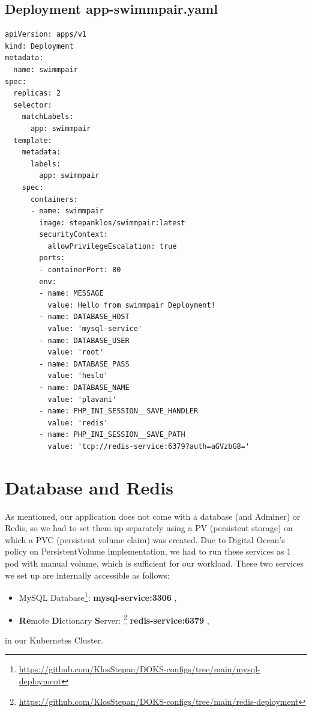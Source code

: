 \subsection*{Deployment app-swimmpair.yaml}
\begin{lstlisting}
apiVersion: apps/v1
kind: Deployment
metadata:
  name: swimmpair
spec:
  replicas: 2
  selector:
    matchLabels:
      app: swimmpair
  template:
    metadata:
      labels:
        app: swimmpair
    spec:
      containers:
      - name: swimmpair
        image: stepanklos/swimmpair:latest
        securityContext:
          allowPrivilegeEscalation: true
        ports:
        - containerPort: 80
        env:
        - name: MESSAGE
          value: Hello from swimmpair Deployment!
        - name: DATABASE_HOST
          value: 'mysql-service'
        - name: DATABASE_USER
          value: 'root'
        - name: DATABASE_PASS
          value: 'heslo'
        - name: DATABASE_NAME
          value: 'plavani' 
        - name: PHP_INI_SESSION__SAVE_HANDLER
          value: 'redis'
        - name: PHP_INI_SESSION__SAVE_PATH
          value: 'tcp://redis-service:6379?auth=aGVzbG8='
\end{lstlisting}    
\section*{Database and Redis}
As mentioned, our application does not come with a database (and Adminer) or Redis, so we had to set them up separately using a PV (persistent storage) on which a PVC (persistent volume claim) was created. Due to Digital Ocean's policy on PersistentVolume implementation, we had to run these services as 1 pod with manual volume, which is sufficient for our workload.
\newline
These two services we set up are internally accessible as follows:
\begin{itemize}
    \item MySQL Database\footnote{\url{https://github.com/KlosStepan/DOKS-configs/tree/main/mysql-deployment}}: \textbf{mysql-service:3306} ,
    \item \textbf{Re}mote \textbf{Di}ctionary \textbf{S}erver: \footnote{\url{https://github.com/KlosStepan/DOKS-configs/tree/main/redis-deployment}} \textbf{redis-service:6379} ,
\end{itemize}
in our Kubernetes Cluster.
